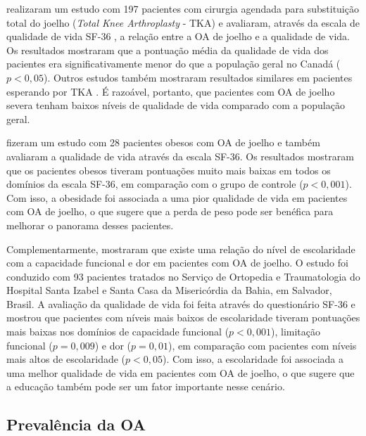  realizaram um estudo com 197 pacientes com cirurgia agendada para substituição total do joelho (\textit{Total Knee Arthroplasty} - TKA) e avaliaram, através da escala de qualidade de vida SF-36 \cite{Ware1992}, a relação entre a OA de joelho e a qualidade de vida. Os resultados mostraram que a pontuação média da qualidade de vida dos pacientes era significativamente menor do que a população geral no Canadá ($p < 0,05$). Outros estudos também mostraram resultados similares em pacientes esperando por TKA \cite{Snider2005,Kapetanakis2011}. É razoável, portanto, que pacientes com OA de joelho severa tenham baixos níveis de qualidade de vida comparado com a população geral.

 fizeram um estudo com 28 pacientes obesos com OA de joelho e também avaliaram a qualidade de vida através da escala SF-36. Os resultados mostraram que os pacientes obesos tiveram pontuações muito mais baixas em todos os domínios da escala SF-36, em comparação com o grupo de controle ($p < 0,001$). Com isso, a obesidade foi associada a uma pior qualidade de vida em pacientes com OA de joelho, o que sugere que a perda de peso pode ser benéfica para melhorar o panorama desses pacientes.

Complementarmente,  mostraram que existe uma relação do nível de escolaridade com a capacidade funcional e dor em pacientes com OA de joelho. O estudo foi conduzido com 93 pacientes tratados no Serviço de Ortopedia e Traumatologia do Hospital Santa Izabel e Santa Casa da Misericórdia da Bahia, em Salvador, Brasil. A avaliação da qualidade de vida foi feita através do questionário SF-36 e mostrou que pacientes com níveis mais baixos de escolaridade tiveram pontuações mais baixas nos domínios de capacidade funcional ($p < 0,001$), limitação funcional ($p = 0,009$) e dor ($p = 0,01$), em comparação com pacientes com níveis mais altos de escolaridade ($p < 0,05$). Com isso, a escolaridade foi associada a uma melhor qualidade de vida em pacientes com OA de joelho, o que sugere que a educação também pode ser um fator importante nesse cenário.

\subsection{Prevalência da OA}

